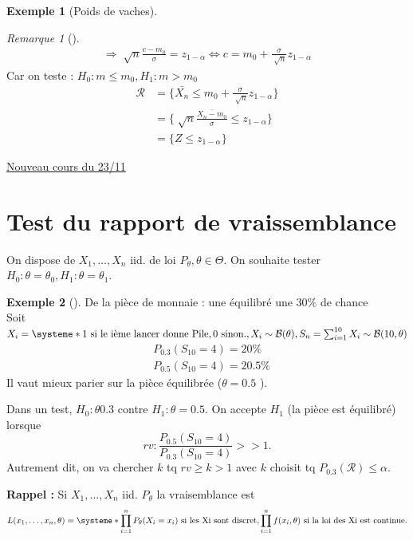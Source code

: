 \documentclass{article}
\theoremstyle{plain}%
\theoremstyle{definition}
\newtheorem{exmp}{Exemple}[section]
\theoremstyle{remark}
\newtheorem*{rem}{Remarque}
\begin{document}
\begin{exmp}[Poids de vaches]
\begin{rem}[]
\begin{align*}
            \Rightarrow \sqrt[]{n}\frac{c - m_0}{\sigma } = z_{1-\alpha } \Leftrightarrow c = m_0 + \frac{\sigma }{\sqrt[]{n}}z_{1 - \alpha}
        \end{align*}
        Car on teste : $ H_0: m \leq m_0, H_1 : m > m_0 $
        \begin{align*}
            \mathcal{R} &= \{\bar{X_n} \leq m_0 + \frac{\sigma }{\sqrt[]{n}} z_{1-\alpha }\} \\
                    &= \{\sqrt[]{n} \frac{\bar{X_n - m_0}}{\sigma} \leq  z_{1-\alpha }\} \\
                    &= \{Z \leq z_{1-\alpha }\}
        \end{align*} 
    \end{rem}
    
    
\end{exmp}

\underline{Nouveau cours du 23/11} \\

\section{Test du rapport de vraissemblance}
On dispose de $ X_1, \dots, X_n $ iid. de loi $ P_\theta , \theta \in \Theta  $. On souhaite tester $ H_0: \theta = \theta _0, H_1: \theta = \theta _1 $.

\begin{exmp}[]
    De la pièce de monnaie : une équilibré une 30\% de chance \\
    Soit $ X_i = \systeme*{
        1 \text{ si le ième lancer donne Pile},
        0 \text{ sinon.}
    }, X_i \sim \mathcal{B}(\theta), S_n = \sum_{i=1}^{10}X_i \sim \mathcal{B}(10,\theta ) $ 
    \begin{align*}
        &P_{0.3} (S_{10} = 4) = 20\% \\
        &P_{0.5} (S_{10} = 4) = 20.5\% 
    \end{align*}
    Il vaut mieux parier sur la pièce équilibrée ($ \theta =0.5 $ ).

    Dans un test, $ H_0: \theta 0.3 $ contre $ H_1: \theta = 0.5 $. On accepte $ H_1 $ (la pièce est équilibré) lorsque 
    \[
        rv : \frac{P_{0.5} (S_{10} = 4)}{P_{0.3} (S_{10} = 4)} >> 1
    .\]
    Autrement dit, on va chercher $ k $ tq $ rv \geq k > 1 $ avec $ k $ choisit tq $ P_{0.3}(\mathcal{R}) \leq \alpha $.
\end{exmp}

\textbf{Rappel :} Si $ X_1, \dots, X_n $ iid. $ P_\theta  $ la vraisemblance est 
\[
    L(x_1,\dots,x_n, \theta ) = \systeme*{
        \prod_{i=1}^{n}P_\theta (X_i = x_i) \text{ si les Xi sont discret}, 
        \prod_{i=1}^{n}f(x_i, \theta ) \text{ si la loi des Xi est continue}
    }
.\]
\end{document}
